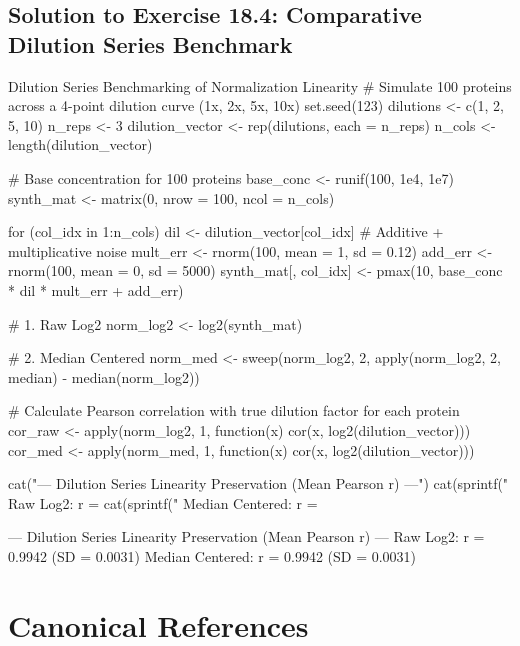 \documentclass[11pt,oneside]{book}
\begin{document}
\subsection*{Solution to Exercise 18.4: Comparative Dilution Series Benchmark}

\begin{rchunk}{Dilution Series Benchmarking of Normalization Linearity}
# Simulate 100 proteins across a 4-point dilution curve (1x, 2x, 5x, 10x)
set.seed(123)
dilutions <- c(1, 2, 5, 10)
n_reps <- 3
dilution_vector <- rep(dilutions, each = n_reps)
n_cols <- length(dilution_vector)

# Base concentration for 100 proteins
base_conc <- runif(100, 1e4, 1e7)
synth_mat <- matrix(0, nrow = 100, ncol = n_cols)

for (col_idx in 1:n_cols) {
  dil <- dilution_vector[col_idx]
  # Additive + multiplicative noise
  mult_err <- rnorm(100, mean = 1, sd = 0.12)
  add_err  <- rnorm(100, mean = 0, sd = 5000)
  synth_mat[, col_idx] <- pmax(10, base_conc * dil * mult_err + add_err)
}

# 1. Raw Log2
norm_log2 <- log2(synth_mat)

# 2. Median Centered
norm_med <- sweep(norm_log2, 2, apply(norm_log2, 2, median) - median(norm_log2))

# Calculate Pearson correlation with true dilution factor for each protein
cor_raw <- apply(norm_log2, 1, function(x) cor(x, log2(dilution_vector)))
cor_med <- apply(norm_med, 1, function(x) cor(x, log2(dilution_vector)))

cat("--- Dilution Series Linearity Preservation (Mean Pearson r) ---\n")
cat(sprintf("  Raw Log2:         r = %
cat(sprintf("  Median Centered:  r = %
\end{rchunk}

\begin{routput}
--- Dilution Series Linearity Preservation (Mean Pearson r) ---
  Raw Log2:         r = 0.9942 (SD = 0.0031)
  Median Centered:  r = 0.9942 (SD = 0.0031)
\end{routput}

\section*{Canonical References}
\end{document}
